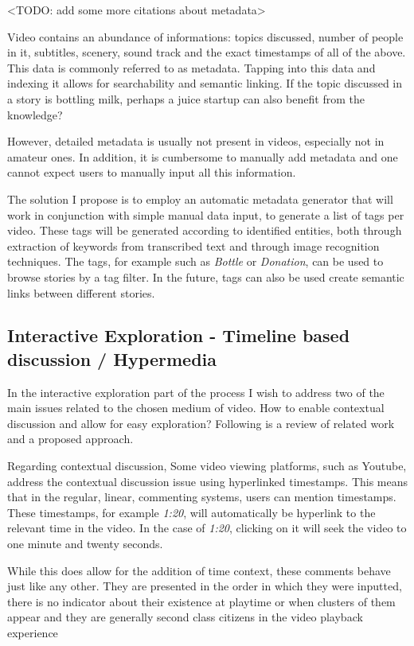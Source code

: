 <TODO: add some more citations about metadata>

Video contains an abundance of informations: topics discussed, number of people in it, subtitles, scenery, sound track and the exact timestamps of all of the above. This data is commonly referred to as metadata. Tapping into this data and indexing it allows for searchability and semantic linking. If the topic discussed in a story is bottling milk, perhaps a juice startup can also benefit from the knowledge?

However, detailed metadata is usually not present in videos, especially not in amateur ones. In addition, it is cumbersome to manually add metadata and one cannot expect users to manually input all this information.

The solution I propose is to employ an automatic metadata generator that will work in conjunction with simple manual data input, to generate a list of tags per video. These tags will be generated according to identified entities, both through extraction of keywords from transcribed text and through image recognition techniques. The tags, for example such as \textit{Bottle} or \textit{Donation}, can be used to browse stories by a tag filter. In the future, tags can also be used create semantic links between different stories.

\subsection{Interactive Exploration - Timeline based discussion / Hypermedia}

In the interactive exploration part of the process I wish to address two of the main issues related to the chosen medium of video. How to enable contextual discussion and allow for easy exploration? Following is a review of related work and a proposed approach. 

Regarding contextual discussion, Some video viewing platforms, such as Youtube, address the contextual discussion issue using hyperlinked timestamps. This means that in the regular, linear, commenting systems, users can mention timestamps. These timestamps, for example  \textit{1:20}, will automatically be hyperlink to the relevant time in the video. In the case of \textit{1:20}, clicking on it will seek the video to one minute and twenty seconds. 


While this does allow for the addition of time context, these comments behave just like any other. They are presented in the order in which they were inputted, there is no indicator about their existence at playtime or when clusters of them appear and they are generally second class citizens in the video playback experience


